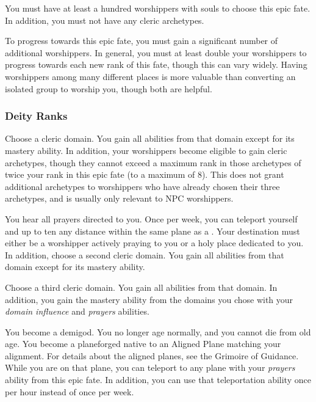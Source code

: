      You must have at least a hundred worshippers with souls to choose this epic fate.
    In addition, you must not have any cleric archetypes.

     To progress towards this epic fate, you must gain a significant number of additional worshippers.
    In general, you must at least double your worshippers to progress towards each new rank of this fate, though this can vary widely.
    Having worshippers among many different places is more valuable than converting an isolated group to worship you, though both are helpful.

    \subsubsection{Deity Ranks}
       Choose a cleric domain.
      You gain all abilities from that domain except for its mastery ability.
      In addition, your worshippers become eligible to gain cleric archetypes, though they cannot exceed a maximum rank in those archetypes of twice your rank in this epic fate (to a maximum of 8).
      This does not grant additional archetypes to worshippers who have already chosen their three archetypes, and is usually only relevant to NPC worshippers.

       You hear all prayers directed to you.
      Once per week, you can teleport yourself and up to ten  any distance within the same plane as a .
      Your destination must either be a worshipper actively praying to you or a holy place dedicated to you.
      In addition, choose a second cleric domain.
      You gain all abilities from that domain except for its mastery ability.

       Choose a third cleric domain.
      You gain all abilities from that domain.
      In addition, you gain the mastery ability from the domains you chose with your \textit{domain influence} and \textit{prayers} abilities.

       You become a demigod.
      You no longer age normally, and you cannot die from old age.
      You become a planeforged native to an Aligned Plane matching your alignment.
      For details about the aligned planes, see the Grimoire of Guidance.
      While you are on that plane, you can teleport to any plane with your \textit{prayers} ability from this epic fate.
      In addition, you can use that teleportation ability once per hour instead of once per week.

